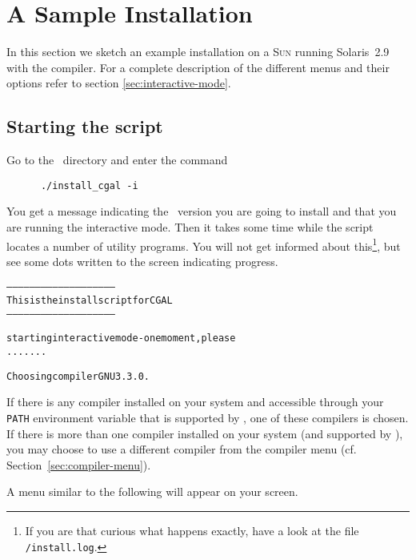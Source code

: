 \section{A Sample Installation}\label{sec:sample-inst}

In this section we sketch an example installation on a \textsc{Sun}
running Solaris~2.9 with the  compiler. For a complete
description of the different menus and their options refer to section
\ref{sec:interactive-mode}.

\subsection{Starting the script}

Go to the \cgaldir\ directory and enter the command
\begin{verbatim}
      ./install_cgal -i
\end{verbatim}

You get a message indicating the \cgal\ version you are going to
install and that you are running the interactive mode. Then it takes
some time while the script locates a number of utility programs. You
will not get informed about this\footnote{If you are that curious what
  happens exactly, have a look at the file
  \texttt{\cgaldir/install.log}.}, but see some
dots written to the screen indicating progress.

{\ccTexHtml{\scriptsize}{}
\begin{alltt}
--------------------------------------------------------
  This is the install script for CGAL \cgalrelease
--------------------------------------------------------

starting interactive mode - one moment, please
.......

  Choosing compiler GNU 3.3.0.

\end{alltt}}
  
If there is any compiler installed on your system and accessible
through your \texttt{PATH} environment variable that is supported by
\cgal, one of these compilers is chosen. If there is more than one
compiler installed on your system (and supported by \cgal), you may
choose to use a different compiler from the compiler menu (cf.
Section~\ref{sec:compiler-menu}).

A menu similar to the following will appear on your screen.

